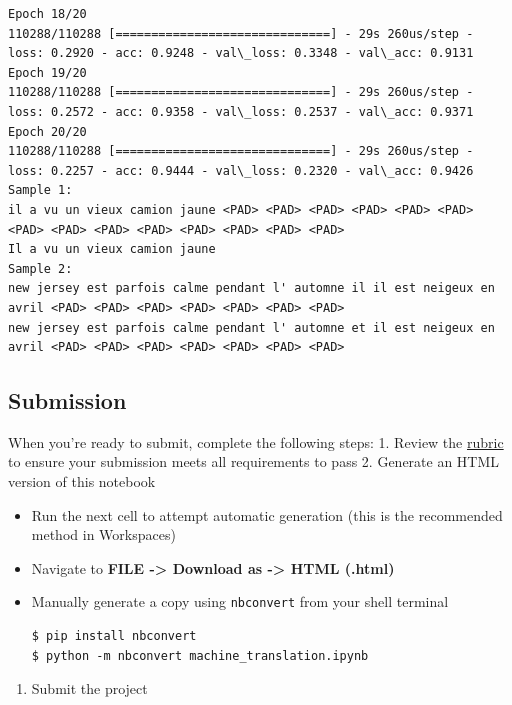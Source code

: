 \documentclass[11pt]{article}
\providecommand{\tightlist}{%
      \setlength{\itemsep}{0pt}\setlength{\parskip}{0pt}}
\begin{document}
\begin{Verbatim}[commandchars=\\\{\}]
Epoch 18/20
110288/110288 [==============================] - 29s 260us/step - loss: 0.2920 - acc: 0.9248 - val\_loss: 0.3348 - val\_acc: 0.9131
Epoch 19/20
110288/110288 [==============================] - 29s 260us/step - loss: 0.2572 - acc: 0.9358 - val\_loss: 0.2537 - val\_acc: 0.9371
Epoch 20/20
110288/110288 [==============================] - 29s 260us/step - loss: 0.2257 - acc: 0.9444 - val\_loss: 0.2320 - val\_acc: 0.9426
Sample 1:
il a vu un vieux camion jaune <PAD> <PAD> <PAD> <PAD> <PAD> <PAD> <PAD> <PAD> <PAD> <PAD> <PAD> <PAD> <PAD> <PAD>
Il a vu un vieux camion jaune
Sample 2:
new jersey est parfois calme pendant l' automne il il est neigeux en avril <PAD> <PAD> <PAD> <PAD> <PAD> <PAD> <PAD>
new jersey est parfois calme pendant l' automne et il est neigeux en avril <PAD> <PAD> <PAD> <PAD> <PAD> <PAD> <PAD>

    \end{Verbatim}

    \subsection{Submission}\label{submission}

When you're ready to submit, complete the following steps: 1. Review the
\href{https://review.udacity.com/\#!/rubrics/1004/view}{rubric} to
ensure your submission meets all requirements to pass 2. Generate an
HTML version of this notebook

\begin{itemize}
\item
  Run the next cell to attempt automatic generation (this is the
  recommended method in Workspaces)
\item
  Navigate to \textbf{FILE -\textgreater{} Download as -\textgreater{}
  HTML (.html)}
\item
  Manually generate a copy using \texttt{nbconvert} from your shell
  terminal

\begin{verbatim}
$ pip install nbconvert
$ python -m nbconvert machine_translation.ipynb
\end{verbatim}
\end{itemize}

\begin{enumerate}
\def\labelenumi{\arabic{enumi}.}
\setcounter{enumi}{2}
\tightlist
\item
  Submit the project
\end{enumerate}
\end{document}
